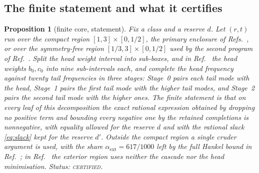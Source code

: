 \documentclass[aps,10pt,superscriptaddress,floatfix,amsmath,amssymb,nofootinbib]{revtex4-2}
\newcommand{\CERT}{\textsc{certified}}
\newtheorem{proposition}{Proposition}
\begin{document}
\subsection{The finite statement and what it certifies}

\begin{proposition}[finite core, statement]\label{prop:finitecore}
Fix a class and a reserve $d$. Let $(r,t)$ run over the compact region
$[1,3]\times[0,1/2]$, the primary enclosure of Refs.~\cite{finiteenergy,anisosharp}, or over
the symmetry-free region $[1/3,3]\times[0,1/2]$ used by the second program of
Ref.~\cite{anisosharp}. Split the head weight interval into sub-boxes, and in
Ref.~\cite{finiteenergy} the head weights $b_0,c_0$ into nine sub-intervals each, and
complete the head frequency against twenty tail frequencies in three stages: Stage~0 pairs
each tail mode with the head, Stage~1 pairs the first tail mode with the higher tail modes,
and Stage~2 pairs the second tail mode with the higher ones. The finite statement is that on
every leaf of this decomposition the exact rational expression obtained by dropping no
positive term and bounding every negative one by the retained completions is nonnegative,
with equality allowed for the reserve $d$ and with the rational slack \eqref{eq:slack} kept
for the reserve $d'$. Outside the compact region a single cruder argument is used, with the
share $\alpha_{\mathrm{ext}}=617/1000$ left by the full Hankel bound in
Ref.~\cite{finiteenergy}; in Ref.~\cite{anisosharp} the exterior region uses neither the
cascade nor the head minimisation.
Status: \CERT{}.
\end{proposition}
\end{document}
